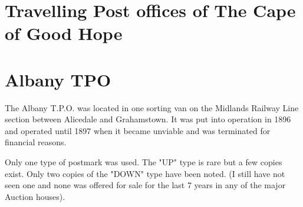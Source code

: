 \section{Travelling Post offices of The Cape of Good Hope}
	 
\section{Albany TPO}



The Albany T.P.O. was located in one sorting van on the 
Midlands Railway Line section between Alicedale and Grahamstown. 
It was put into operation in 1896 and operated until 1897 when 
it became unviable and was terminated for financial reasons.

Only one type of postmark was used. The "UP" type is rare but a 
few copies exist. Only two copies of the "DOWN" type have 
been noted. (I still have not seen one and none was offered 
for sale for the last 7 years in any of the major Auction houses).

 

 

 

 

 

 

 

 

 

 

   